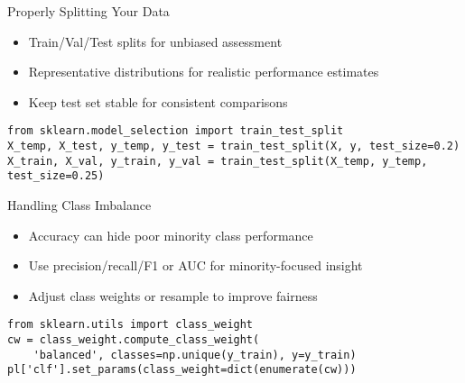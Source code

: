 \documentclass[aspectratio=169]{beamer}
\begin{document}

\begin{frame}[fragile]{Properly Splitting Your Data}
\begin{itemize}
\item Train/Val/Test splits for unbiased assessment
\item Representative distributions for realistic performance estimates
\item Keep test set stable for consistent comparisons
\end{itemize}

\begin{verbatim}
from sklearn.model_selection import train_test_split
X_temp, X_test, y_temp, y_test = train_test_split(X, y, test_size=0.2)
X_train, X_val, y_train, y_val = train_test_split(X_temp, y_temp, test_size=0.25)
\end{verbatim}
\end{frame}


\begin{frame}[fragile]{Handling Class Imbalance}
\begin{itemize}
\item Accuracy can hide poor minority class performance
\item Use precision/recall/F1 or AUC for minority-focused insight
\item Adjust class weights or resample to improve fairness
\end{itemize}

\begin{verbatim}
from sklearn.utils import class_weight
cw = class_weight.compute_class_weight(
    'balanced', classes=np.unique(y_train), y=y_train)
pl['clf'].set_params(class_weight=dict(enumerate(cw)))
\end{verbatim}
\end{frame}
\end{document}
